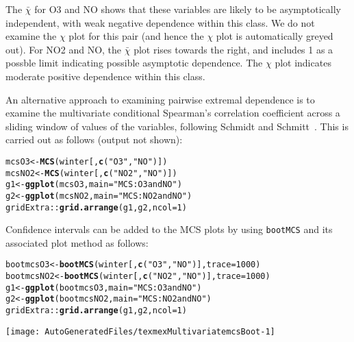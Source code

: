 \documentclass[10pt]{article}\usepackage[]{graphicx}\usepackage[]{color}
\makeatletter
\def\maxwidth{ %
  \ifdim\Gin@nat@width>\linewidth
    \linewidth
  \else
    \Gin@nat@width
  \fi
}
\newcommand{\hlnum}[1]{\textcolor[rgb]{0.686,0.059,0.569}{#1}}%
\newcommand{\hlstr}[1]{\textcolor[rgb]{0.192,0.494,0.8}{#1}}%
\newcommand{\hlopt}[1]{\textcolor[rgb]{0,0,0}{#1}}%
\newcommand{\hlstd}[1]{\textcolor[rgb]{0.345,0.345,0.345}{#1}}%
\newcommand{\hlkwb}[1]{\textcolor[rgb]{0.69,0.353,0.396}{#1}}%
\newcommand{\hlkwc}[1]{\textcolor[rgb]{0.333,0.667,0.333}{#1}}%
\newcommand{\hlkwd}[1]{\textcolor[rgb]{0.737,0.353,0.396}{\textbf{#1}}}%
\newenvironment{kframe}{%
 \def\at@end@of@kframe{}%
 \ifinner\ifhmode%
  \def\at@end@of@kframe{\end{minipage}}%
  \begin{minipage}{\columnwidth}%
 \fi\fi%
 \def\FrameCommand##1{\hskip\@totalleftmargin \hskip-\fboxsep
 \colorbox{shadecolor}{##1}\hskip-\fboxsep
     \hskip-\linewidth \hskip-\@totalleftmargin \hskip\columnwidth}%
 \MakeFramed {\advance\hsize-\width
   \@totalleftmargin\z@ \linewidth\hsize
   \@setminipage}}%
 {\par\unskip\endMakeFramed%
 \at@end@of@kframe}
\newenvironment{knitrout}{}{} %
\makeatother
\begin{document}
The $\bar\chi$ for O3 and NO shows that these variables are likely to be
asymptotically independent, with weak negative dependence within this class. We
do not examine the $\chi$ plot for this pair (and hence the $\chi$ plot is
automatically greyed out). For NO2 and NO, the $\bar\chi$ plot rises towards the
right, and includes 1 as a possble limit indicating possible asymptotic
dependence. The $\chi$ plot indicates moderate positive dependence within this
class.

An alternative approach to examining pairwise extremal dependence
is to examine the multivariate conditional Spearman's correlation
coefficient across a
sliding window of values of the variables, following Schmidt
and Schmitt~\cite{schmidtSchmitt}.  This is carried out as follows (output not shown):

\begin{knitrout}
\color{fgcolor}\begin{kframe}
\begin{alltt}
\hlstd{mcsO3} \hlkwb{<-} \hlkwd{MCS}\hlstd{(winter[,} \hlkwd{c}\hlstd{(}\hlstr{"O3"}\hlstd{,} \hlstr{"NO"}\hlstd{)])}
\hlstd{mcsNO2} \hlkwb{<-} \hlkwd{MCS}\hlstd{(winter[,} \hlkwd{c}\hlstd{(}\hlstr{"NO2"}\hlstd{,} \hlstr{"NO"}\hlstd{)])}
\hlstd{g1} \hlkwb{<-} \hlkwd{ggplot}\hlstd{(mcsO3,} \hlkwc{main}\hlstd{=}\hlstr{"MCS: O3 and NO"}\hlstd{)}
\hlstd{g2} \hlkwb{<-} \hlkwd{ggplot}\hlstd{(mcsNO2,} \hlkwc{main}\hlstd{=}\hlstr{"MCS: NO2 and NO"}\hlstd{)}
\hlstd{gridExtra}\hlopt{::}\hlkwd{grid.arrange}\hlstd{(g1,g2,}\hlkwc{ncol}\hlstd{=}\hlnum{1}\hlstd{)}
\end{alltt}
\end{kframe}
\end{knitrout}

Confidence intervals can be added to the MCS plots by using
{\tt bootMCS} and its associated plot method as follows:

\begin{knitrout}
\color{fgcolor}\begin{kframe}
\begin{alltt}
\hlstd{bootmcsO3} \hlkwb{<-} \hlkwd{bootMCS}\hlstd{(winter[,} \hlkwd{c}\hlstd{(}\hlstr{"O3"}\hlstd{,} \hlstr{"NO"}\hlstd{)],}\hlkwc{trace}\hlstd{=}\hlnum{1000}\hlstd{)}
\hlstd{bootmcsNO2} \hlkwb{<-} \hlkwd{bootMCS}\hlstd{(winter[,} \hlkwd{c}\hlstd{(}\hlstr{"NO2"}\hlstd{,} \hlstr{"NO"}\hlstd{)],}\hlkwc{trace}\hlstd{=}\hlnum{1000}\hlstd{)}
\hlstd{g1} \hlkwb{<-} \hlkwd{ggplot}\hlstd{(bootmcsO3,} \hlkwc{main}\hlstd{=}\hlstr{"MCS: O3 and NO"}\hlstd{)}
\hlstd{g2} \hlkwb{<-} \hlkwd{ggplot}\hlstd{(bootmcsNO2,} \hlkwc{main}\hlstd{=}\hlstr{"MCS: NO2 and NO"}\hlstd{)}
\hlstd{gridExtra}\hlopt{::}\hlkwd{grid.arrange}\hlstd{(g1,g2,}\hlkwc{ncol}\hlstd{=}\hlnum{1}\hlstd{)}
\end{alltt}
\end{kframe}
\texttt{[image: AutoGeneratedFiles/texmexMultivariatemcsBoot-1]} 

\end{knitrout}
\end{document}
